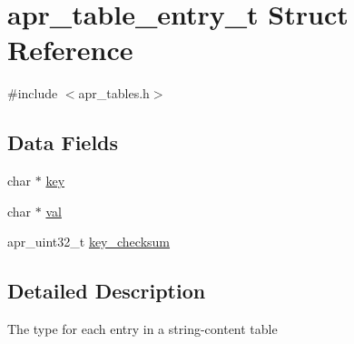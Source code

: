 \hypertarget{structapr__table__entry__t}{\section{apr\-\_\-table\-\_\-entry\-\_\-t Struct Reference}
\label{structapr__table__entry__t}
}


{\ttfamily \#include $<$apr\-\_\-tables.\-h$>$}

\subsection*{Data Fields}
\begin{DoxyCompactItemize}
\item 
char $\ast$ \hyperlink{structapr__table__entry__t_abdccb35ea49dd95082fdce65a5a6001f}{key}
\item 
char $\ast$ \hyperlink{structapr__table__entry__t_a755371d0aa6a9487b502c34807271e6f}{val}
\item 
apr\-\_\-uint32\-\_\-t \hyperlink{structapr__table__entry__t_a0c51574420b6cc7bc6c2e35710e0ad3a}{key\-\_\-checksum}
\end{DoxyCompactItemize}


\subsection{Detailed Description}
The type for each entry in a string-\/content table 

